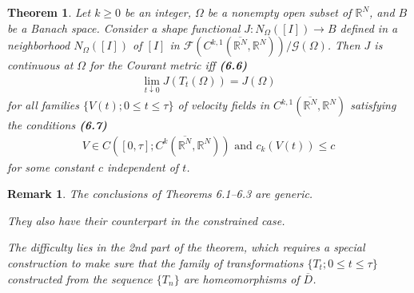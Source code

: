 \documentclass{book}
\numberwithin{equation}{section}
\newtheorem{theorem}{Theorem}[section]
\newtheorem{remark}{Remark}[section]
\begin{document}
\begin{enumerate}
    \begin{theorem}
        Let $k\ge 0$ be an integer, $\Omega$ be a nonempty open subset of $\mathbb{R}^N$, and $B$ be a Banach space. Consider a shape functional $J:N_\Omega([I])\to B$ defined in a neighborhood $N_\Omega([I])$ of $[I]$ in $\mathcal{F}(C^{k,1}(\overline{\mathbb{R}^N},\mathbb{R}^N))/\mathcal{G}(\Omega)$. Then $J$ is continuous at $\Omega$ for the Courant metric iff \textbf{(6.6)}
        \begin{align*}
            \lim_{t\downarrow 0} J\left(T_t(\Omega)\right) = J(\Omega)
        \end{align*}
        for all families $\{V(t);0\le t\le\tau\}$ of velocity fields in $C^{k,1}(\overline{\mathbb{R}^N},\mathbb{R}^N)$ satisfying the conditions \textbf{(6.7)}
        \begin{align*}
            V\in C([0,\tau];C^k(\overline{\mathbb{R}^N},\mathbb{R}^N)) \mbox{ and } c_k\left(V(t)\right)\le c
        \end{align*}
        for some constant $c$ independent of $t$.
    \end{theorem}
    
    \begin{remark}
        The conclusions of Theorems 6.1--6.3 are generic.
        
        They also have their counterpart in the constrained case.
        
        The difficulty lies in the 2nd part of the theorem, which requires a special construction to make sure that the family of transformations $\{T_t;0\le t\le\tau\}$ constructed from the sequence $\{T_n\}$ are homeomorphisms of $\overline{D}$. 
    \end{remark}
\end{enumerate}
\end{document}
